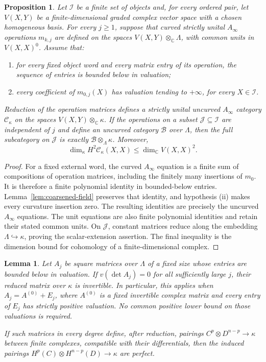 \documentclass[11pt]{article}
\numberwithin{equation}{section}
\newtheorem{proposition}[theorem]{Proposition}
\newtheorem{lemma}[theorem]{Lemma}
\theoremstyle{definition}
\theoremstyle{remark}
\newcommand{\C}{\mathbb C}
\begin{document}
\begin{proposition}\label{prop:field-category}
Let $\mathcal I$ be a finite set of objects and, for every ordered pair,
let $V(X,Y)$ be a finite-dimensional graded complex vector space with
a chosen homogeneous basis.  For every $j\ge1$, suppose that curved
strictly unital $A_\infty$ operations $m_{k,j}$ are defined on the spaces
$V(X,Y)\otimes_\C\Lambda$, with common units in $V(X,X)^0$.
Assume that:
\begin{enumerate}[label=\textup{(\roman*)}]
 \item for every fixed object word and every matrix entry of its
 operation, the sequence of entries is bounded below in valuation;
 \item every coefficient of $m_{0,j}(X)$ has valuation tending to
 $+\infty$, for every $X\in\mathcal I$.
\end{enumerate}
Reduction of the operation matrices defines a strictly unital
uncurved $A_\infty$ category $\mathcal C_\kappa$ on the spaces
$V(X,Y)\otimes_\C\kappa$.
If the operations on a subset $\mathcal J\subseteq\mathcal I$ are
independent of $j$ and define an uncurved category $\mathcal B$ over
$\Lambda$, then the full subcategory on $\mathcal J$ is exactly
$\mathcal B\otimes_\Lambda\kappa$.  Moreover,
\[
 \dim_\kappa H^2\mathcal C_\kappa(X,X)
       \le \dim_\C V(X,X)^2.
\]
\end{proposition}

\begin{proof}
For a fixed external word, the curved $A_\infty$ equation is a finite
sum of compositions of operation matrices, including the finitely
many insertions of $m_0$.  It is therefore a finite polynomial
identity in bounded-below entries.  Lemma~\ref{lem:coarsened-field}
preserves that identity, and hypothesis \textup{(ii)} makes every
curvature insertion zero.  The resulting identities are precisely
the uncurved $A_\infty$ equations.  The unit equations are also finite
polynomial identities and retain their stated common units.  On
$\mathcal J$, constant matrices reduce along the embedding
$\Lambda\hookrightarrow\kappa$, proving the scalar-extension
assertion.  The final inequality is the dimension bound for
cohomology of a finite-dimensional complex.
\end{proof}

\begin{lemma}\label{lem:field-pairing}
Let $A_j$ be square matrices over $\Lambda$ of a fixed size whose
entries are bounded below in valuation.  If $v(\det A_j)=0$ for all
sufficiently large $j$, their reduced matrix over $\kappa$ is
invertible.  In particular, this applies when
$A_j=A^{(0)}+E_j$, where $A^{(0)}$ is a fixed invertible complex
matrix and every entry of $E_j$ has strictly positive valuation.
No common positive lower bound on those valuations is required.

If such matrices in every degree define, after reduction, pairings
$C^p\otimes D^{n-p}\to\kappa$ between finite complexes, compatible
with their differentials, then the induced pairings
$H^p(C)\otimes H^{n-p}(D)\to\kappa$ are perfect.
\end{lemma}
\end{document}

